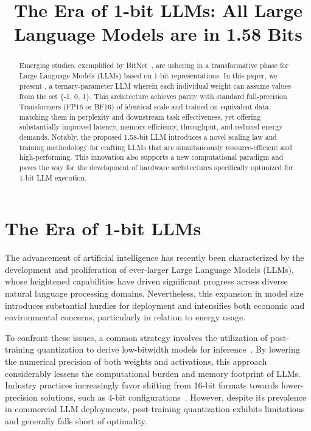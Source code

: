 \title{The Era of 1-bit LLMs: All Large Language Models are in 1.58 Bits}

\begin{abstract}
Emerging studies, exemplified by BitNet~\cite{bitnet}, are ushering in a transformative phase for Large Language Models (LLMs) based on 1-bit representations. In this paper, we present \textbf{}, a ternary-parameter LLM wherein each individual weight can assume values from the set \{-1, 0, 1\}. This architecture achieves parity with standard full-precision Transformers (FP16 or BF16) of identical scale and trained on equivalent data, matching them in perplexity and downstream task effectiveness, yet offering substantially improved latency, memory efficiency, throughput, and reduced energy demands. Notably, the proposed 1.58-bit LLM introduces a novel scaling law and training methodology for crafting LLMs that are simultaneously resource-efficient and high-performing. This innovation also supports a new computational paradigm and paves the way for the development of hardware architectures specifically optimized for 1-bit LLM execution.
\end{abstract}

\section{The Era of 1-bit LLMs}

The advancement of artificial intelligence has recently been characterized by the development and proliferation of ever-larger Large Language Models (LLMs), whose heightened capabilities have driven significant progress across diverse natural language processing domains. Nevertheless, this expansion in model size introduces substantial hurdles for deployment and intensifies both economic and environmental concerns, particularly in relation to energy usage.

To confront these issues, a common strategy involves the utilization of post-training quantization to derive low-bitwidth models for inference~\cite{smoothquant, gptq, quip, quip_sharp}. By lowering the numerical precision of both weights and activations, this approach considerably lessens the computational burden and memory footprint of LLMs. Industry practices increasingly favor shifting from 16-bit formats towards lower-precision solutions, such as 4-bit configurations~\cite{gptq, awq}. However, despite its prevalence in commercial LLM deployments, post-training quantization exhibits limitations and generally falls short of optimality.

